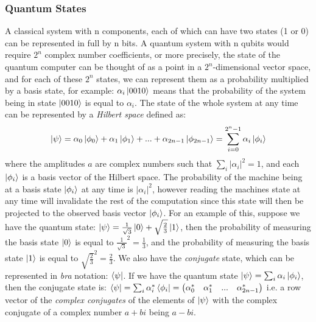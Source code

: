 \subsubsection{Quantum States}
A classical system with n components, each of which can have two states (1 or 0) can be represented in full by n bits. A quantum system with n qubits would require $2^{n}$ complex number coefficients, or more precisely, the state of the quantum computer can be thought of as a point in a $2^{n}$-dimensional vector space, and for each of these $2^{n}$ states, we can represent them as a probability multiplied by a basis state, for example: $\alpha_i\ket{0010}$ means that the probability of the system being in state $\ket{0010}$ is equal to $\alpha_i$. The state of the whole system at any time can be represented by a \emph{Hilbert space} defined as:
$$ \ket{\psi} = \alpha_0\ket{\phi_0} + \alpha_1\ket{\phi_1} + ... + \alpha_{2n-1}\ket{\phi_{2n-1}} = \sum_{i=0}^{2^{n}-1} \alpha_{i} \ket{\phi_i} $$
where the amplitudes $a$ are complex numbers such that $\sum_{i}|\alpha_{i}|^{2} = 1$, and each $\ket{\phi_i}$ is a basis vector of the Hilbert space. The probability of the machine being at a basis state $\ket{\phi_i}$ at any time is $|\alpha_i|^2$, however reading the machines state at any time will invalidate the rest of the computation since this state will then be projected to the observed basis vector $\ket{\phi_i}$. For an example of this, suppose we have the quantum state: $\ket{\psi} = \frac{1}{\sqrt{3}}\ket{0} + \sqrt{\frac{2}{3}}\ket{1}$, then the probability of measuring the basis state $\ket{0}$ is equal to $\frac{1}{\sqrt{3}}^2 = \frac{1}{3}$, and the probability of measuring the basis state $\ket{1}$ is equal to $\sqrt{\frac{2}{3}}^2 = \frac{2}{3}$. We also have the \emph{conjugate} state, which can be represented in \emph{bra} notation: $\bra{\psi}$. If we have the quantum state $\ket{\psi} = \sum_i\alpha_i\ket{\phi_i}$, then the conjugate state is: $\bra{\psi} = \sum_i\alpha_i^*\bra{\phi_i} = \begin{pmatrix} \alpha_0^* & \alpha_1^* & ... & \alpha_{2n-1}^* \end{pmatrix}$ i.e. a row vector of the \emph{complex conjugates} of the elements of $\ket{\psi}$ with the complex conjugate of a complex number $a + b\textit{i}$ being $a -b\textit{i}$.
